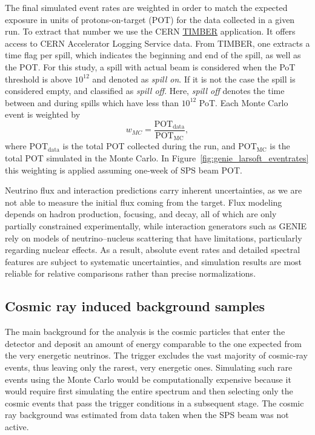 The final simulated event rates are weighted in order to match the expected  exposure in units of protons-on-target (POT) for the data collected in a given run. To extract that number we use the CERN \href{http://timber.cern.ch}{TIMBER} application. It offers access to CERN Accelerator Logging Service data. From TIMBER, one extracts a time flag per spill, which indicates the beginning and end of the spill, as well as the POT. For this study, a spill with actual beam is considered when the PoT threshold is above $10^{12}$ and denoted as \textit{spill on}. If it is not the case the spill is considered empty, and classified as \textit{spill off}. Here, \textit{spill off} denotes the time between and during spills which have less than $10^{12}$ PoT. Each Monte Carlo event is weighted by
\begin{equation}
    w_{MC}= \frac{\text{POT}_{\text{data}}}{\text{POT}_{\text{MC}}},
\end{equation}
where ${\text{POT}_{\text{data}}}$ is the total POT collected during the run, and ${\text{POT}_{\text{MC}}}$ is the total POT simulated in the Monte Carlo. In Figure~\ref{fig:genie_larsoft_eventrates} this weighting is applied assuming one-week of SPS beam POT.

Neutrino flux and interaction predictions carry inherent uncertainties, as we are not able to measure the initial flux coming from the target. Flux modeling depends on hadron production, focusing, and decay, all of which are only partially constrained experimentally, while interaction generators such as GENIE rely on models of neutrino–nucleus scattering that have limitations, particularly regarding nuclear effects. As a result, absolute event rates and detailed spectral features are subject to systematic uncertainties, and simulation results are most reliable for relative comparisons rather than precise normalizations.

\subsection{Cosmic ray induced background samples}
The main background for the analysis is the cosmic particles that enter the detector and deposit an amount of energy comparable to the one expected from the very energetic neutrinos. The trigger excludes the vast majority of cosmic-ray events, thus leaving only the rarest, very energetic ones. Simulating such rare events using the Monte Carlo would be computationally expensive because it would require first simulating the entire spectrum and then selecting only the cosmic events that pass the trigger conditions in a subsequent stage. 
The cosmic ray background was estimated from data taken when the SPS beam was not active.

